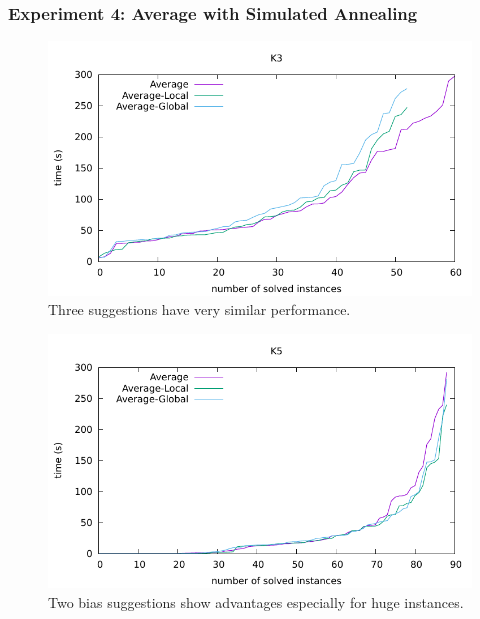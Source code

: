 \documentclass[12pt,a4paper,twoside]{scrartcl}
\numberwithin{equation}{section}
\begin{document}
\subsubsection{Experiment 4: Average with Simulated Annealing} 
  \begin{figure}[H]
\begin{center}
  \includegraphics[scale = 1]{DATA/K3/e3a.pdf}
  \end{center}
  \caption{Three suggestions have very similar performance.}
  \label{Experiment 4 k3-a cactus plot}
  \end{figure}
  \begin{figure}[H]
\begin{center}
  \includegraphics[scale = 1]{DATA/K5/e3a.pdf}
  \end{center}
  \caption{Two bias suggestions show advantages especially for huge instances.}
  \label{Experiment 4 k5-a cactus plot}
  \end{figure}
\end{document}

